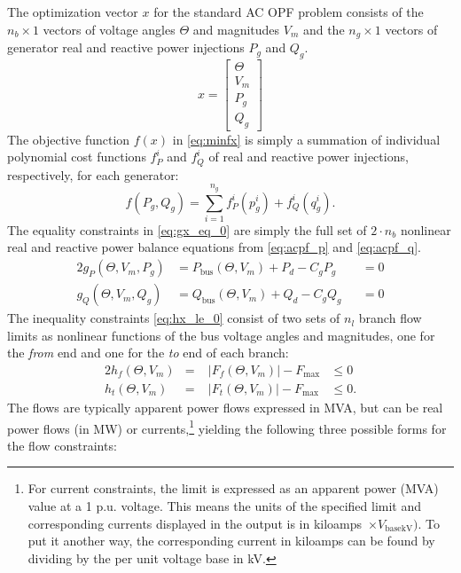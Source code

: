 \documentclass[12pt]{article}
\numberwithin{equation}{section}
\numberwithin{table}{section}
\numberwithin{figure}{section}
\begin{document}
The optimization vector $x$ for the standard AC OPF problem consists of the $n_b \times 1$ vectors of voltage angles $\Theta$ and magnitudes $V_m$ and the $n_g \times 1$ vectors of generator real and reactive power injections $P_g$ and $Q_g$.
\begin{equation}
x = \left[\begin{array}{c}\Theta \\ V_m \\ P_g \\ Q_g \end{array}\right]
\end{equation}
The objective function $f(x)$ in \eqref{eq:minfx} is simply a summation of individual polynomial cost functions $f_P^i$ and $f_Q^i$ of real and reactive power injections, respectively, for each generator:
\begin{equation}
f(P_g, Q_g) = \sum_{i=1}^{n_g} f_P^i(p_g^i) +  f_Q^i(q_g^i).
\end{equation}
The equality constraints in \eqref{eq:gx_eq_0} are simply the full set of $2 \cdot n_b$ nonlinear real and reactive power balance equations from \eqref{eq:acpf_p} and \eqref{eq:acpf_q}.
\begin{alignat}{2}
g_P(\Theta, V_m, P_g) &= P_\mathrm{bus}(\Theta, V_m) + P_d - C_g P_g &&= 0 \label{eq:polar_pwrbal_p} \\
g_Q(\Theta, V_m, Q_g) &= Q_\mathrm{bus}(\Theta, V_m) + Q_d - C_g Q_g &&= 0 \label{eq:polar_pwrbal_q}
\end{alignat}
The inequality constraints \eqref{eq:hx_le_0} consist of two sets of $n_l$ branch flow limits as nonlinear functions of the bus voltage angles and magnitudes, one for the \emph{from} end and one for the \emph{to} end of each branch:
\begin{alignat}{2}
h_f(\Theta, V_m) &=\;& \left| F_f(\Theta, V_m) \right| - F_\mathrm{max} &\le 0 \label{eq:acopf_ieqf} \\
h_t(\Theta, V_m) &= & \left| F_t(\Theta, V_m) \right| - F_\mathrm{max} &\le 0. \label{eq:acopf_ieqt}
\end{alignat}
The flows are typically apparent power flows expressed in MVA, but can be real power flows (in MW) or currents,\footnote{For current constraints, the limit is expressed as an apparent power (MVA) value at a 1 p.u. voltage. This means the units of the specified limit and corresponding currents displayed in the output is in kiloamps~$\times V_\mathrm{basekV})$. To put it another way, the corresponding current in kiloamps can be found by dividing  by the per unit voltage base in kV.} yielding the following three possible forms for the flow constraints:
\end{document}
